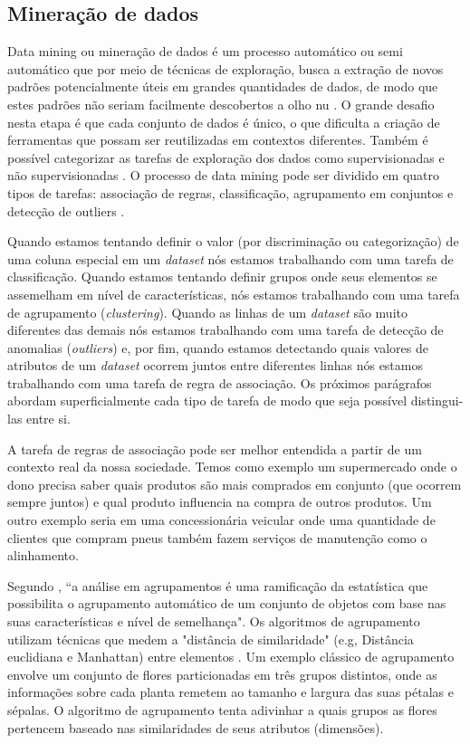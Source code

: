 \subsection{Mineração de dados}

Data mining ou mineração de dados é um processo automático ou semi automático que por meio de técnicas de exploração, busca a extração de novos padrões potencialmente úteis em grandes quantidades de dados, de modo que estes padrões não seriam facilmente descobertos a olho nu \cite{Fayyad1996,Witten2016}. O grande desafio nesta etapa é que cada conjunto de dados é único, o que dificulta a criação de ferramentas que possam ser reutilizadas em contextos diferentes. Também é possível categorizar  as tarefas de exploração dos dados como supervisionadas e não supervisionadas \cite{Aggarwal2015}. O processo de data mining pode ser dividido em quatro tipos de tarefas: associação de regras, classificação, agrupamento em conjuntos e  detecção de outliers \cite{Aggarwal2015}.

Quando estamos tentando definir o valor (por discriminação ou categorização) de uma coluna especial em um \emph{dataset} nós estamos trabalhando com uma tarefa de classificação. Quando estamos tentando definir grupos onde seus elementos se assemelham em nível de características, nós estamos trabalhando com uma tarefa de agrupamento (\emph{clustering}). Quando as linhas de um \emph{dataset} são muito diferentes das demais nós estamos trabalhando com uma tarefa de detecção de anomalias (\emph{outliers}) e, por fim, quando estamos detectando quais valores de atributos de um \emph{dataset} ocorrem juntos entre diferentes linhas nós estamos trabalhando com uma tarefa de regra de associação. Os próximos parágrafos abordam superficialmente cada tipo de tarefa de modo que seja possível distingui-las entre si.

A tarefa de regras de associação pode ser melhor entendida a partir de um contexto real da nossa sociedade. Temos como exemplo um supermercado onde o dono precisa saber quais produtos são mais comprados em conjunto (que ocorrem sempre juntos) e qual produto influencia na compra de outros produtos. Um outro exemplo seria em uma concessionária veicular onde uma quantidade de clientes que compram pneus também fazem serviços de manutenção como o alinhamento.

Segundo , “a análise em agrupamentos é uma ramificação da estatística que possibilita o agrupamento automático de um conjunto de objetos com base nas suas características e nível de semelhança". Os algoritmos de agrupamento utilizam técnicas que medem a "distância de similaridade" (e.g, Distância euclidiana e Manhattan) entre elementos \cite{Sinwar2014}. Um exemplo clássico de agrupamento envolve um conjunto de flores particionadas em três grupos distintos, onde as informações sobre cada planta remetem ao tamanho e largura das suas pétalas e sépalas. O algoritmo de agrupamento tenta adivinhar a quais grupos as flores pertencem baseado nas similaridades de seus atributos (dimensões).

